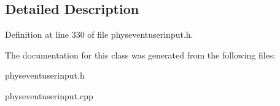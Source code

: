 \subsection{Detailed Description}


Definition at line 330 of file physeventuserinput.h.

The documentation for this class was generated from the following files:\begin{DoxyCompactItemize}
\item 
physeventuserinput.h\item 
physeventuserinput.cpp\end{DoxyCompactItemize}
